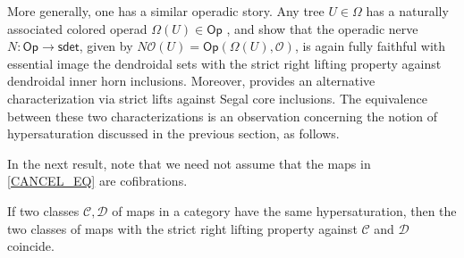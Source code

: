 \documentclass[a4paper,10pt
,draft
]{article}%
\begin{document}
More generally, 
one has a similar operadic story. Any tree $U \in \Omega$ has a naturally associated colored operad 
$\Omega(U) \in \mathsf{Op}$ \cite[\S 3]{MW07}, and
\cite[Prop. 5.3 and Thm. 6.1]{MW09} show that the operadic nerve
$N \colon \mathsf{Op} \to \mathsf{sdet}$, 
given by $N\mathcal{O} (U) = \mathsf{Op}(\Omega(U), \mathcal {O})$,
is again fully faithful
with essential image the dendroidal sets with the strict right lifting property against dendroidal inner horn inclusions.
Moreover, \cite[Cor. 2.6]{CM13a} provides an alternative characterization via strict lifts against Segal core inclusions. The equivalence between these two characterizations is an observation concerning the notion of hypersaturation discussed in the previous section, as follows.


In the next result, note that we need not assume that the maps in
\eqref{CANCEL_EQ} are cofibrations.

\begin{proposition}\label{HYPERLP PROP}
      If two classes $\mathcal{C},\mathcal{D}$
      of maps in a category
      have the same hypersaturation, then
      the two classes of maps with the strict right lifting property against $\mathcal C$ and $\mathcal D$ coincide.
\end{proposition}
\end{document}

